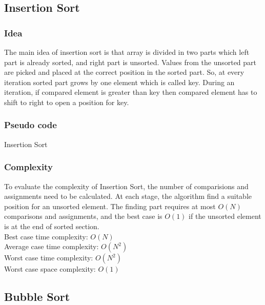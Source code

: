 \documentclass[11pt,a4paper]{article}
\begin{document}
\subsection{Insertion Sort}
\subsubsection*{Idea}
The main idea of insertion sort is that array is divided in two parts which left part is already sorted, and right part is unsorted.
Values from the unsorted part are picked and placed at the correct position in the sorted part.
So, at every iteration sorted part grows by one element which is called key.
During an iteration, if compared element is greater than key then compared element has to shift to right to open a position for key.

\subsubsection*{Pseudo code}
\begin{algorithm2e}
  \SetAlgoLined
  \caption{Insertion Sort}
\end{algorithm2e}
\newpage
\subsubsection*{Complexity}
To evaluate the complexity of Insertion Sort, the number of comparisions and assignments need to be calculated.
At each stage, the algorithm find a suitable position for an unsorted element.
The finding part requires at most $O(N)$ comparisons and assignments, and the best case is $O(1)$ if 
the unsorted element is at the end of sorted section.\\
Best case time complexity: $O(N)$ \\
Average case time complexity: $O(N^2)$\\
Worst case time complexity: $O(N^2)$ \\
Worst case space complexity: $O(1)$

\subsection{Bubble Sort}
\end{document}
